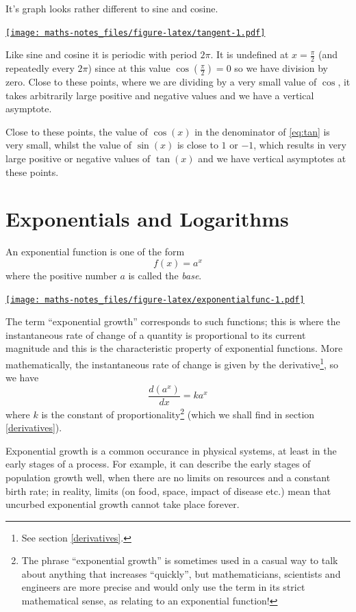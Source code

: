 \documentclass[
]{book}
\theoremstyle{definition}
\theoremstyle{definition}
\theoremstyle{definition}
\theoremstyle{definition}
\theoremstyle{remark}
\begin{document}
It's graph looks rather different to sine and cosine.

\href{https://www.desmos.com/calculator/ncqey1cfus}{\texttt{[image: maths-notes\_files/figure-latex/tangent-1.pdf]}}

Like sine and cosine it is periodic with period \(2\pi\). It is undefined at \(x=\frac{\pi}{2}\) (and repeatedly every \(2\pi\)) since at this value \(\cos(\frac{\pi}{2})=0\) so we have division by zero. Close to these points, where we are dividing by a very small value of \(\cos\), it takes arbitrarily large positive and negative values and we have a vertical asymptote.

Close to these points, the value of \(\cos(x)\) in the denominator of \eqref{eq:tan} is very small, whilst the value of \(\sin(x)\) is close to \(1\) or \(-1\), which results in very large positive or negative values of \(\tan(x)\) and we have vertical asymptotes at these points.

\hypertarget{exponentials-and-logarithms}{%
\section{Exponentials and Logarithms}\label{exponentials-and-logarithms}}

An exponential function is one of the form
\[
f(x)=a^x
\]
where the positive number \(a\) is called the \emph{base}.

\href{https://www.desmos.com/calculator/5d0shgjfag}{\texttt{[image: maths-notes\_files/figure-latex/exponentialfunc-1.pdf]}}

The term ``exponential growth'' corresponds to such functions; this is where the instantaneous rate of change of a quantity is proportional to its current magnitude and this is the characteristic property of exponential functions. More mathematically, the instantaneous rate of change is given by the derivative\footnote{See section \ref{derivatives}.}, so we have
\begin{equation}
\frac{d(a^x)}{dx}=ka^x
\label{eq:daxdx}
\end{equation}
where \(k\) is the constant of proportionality\footnote{The phrase ``exponential growth'' is sometimes used in a casual way to talk about anything that increases ``quickly'', but mathematicians, scientists and engineers are more precise and would only use the term in its strict mathematical sense, as relating to an exponential function!} (which we shall find in section \ref{derivatives}).

Exponential growth is a common occurance in physical systems, at least in the early stages of a process. For example, it can describe the early stages of population growth well, when there are no limits on resources and a constant birth rate; in reality, limits (on food, space, impact of disease etc.) mean that uncurbed exponential growth cannot take place forever.
\end{document}
